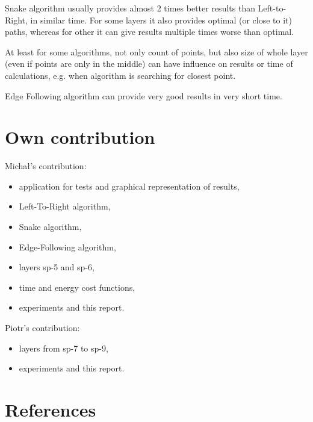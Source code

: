 \documentclass[titlepage]{article}
\begin{document}
Snake algorithm usually provides almost 2 times better results than Left-to-Right, in similar time. For some layers it also provides optimal (or close to it) paths, whereas for other it can give results multiple times worse than optimal.

At least for some algorithms, not only count of points, but also size of whole layer (even if points are only in the middle) can have influence on results or time of calculations, e.g. when algorithm is searching for closest point.

Edge Following algorithm can provide very good results in very short time.

\section{Own contribution}
Michał's contribution:
\begin{itemize}
\item application for tests and graphical representation of results,
\item Left-To-Right algorithm,
\item Snake algorithm,
\item Edge-Following algorithm,
\item layers sp-5 and sp-6,
\item time and energy cost functions,
\item experiments and this report.
\end{itemize}
Piotr's contribution:
\begin{itemize}
\item layers from sp-7 to sp-9,
\item experiments and this report. 
\end{itemize}

\section{References}
\end{document}

